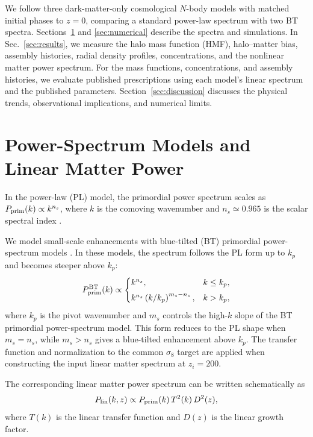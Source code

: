 \documentclass[
 reprint,
 superscriptaddress,
 nofootinbib,
 nobibnotes,
 amsmath,
 amssymb,
 aps,
 prd,
 floatfix,
 longbibliography
]{revtex4-2}
\DeclareRobustCommand{\change}[1]{#1}
\begin{document}
\change{We follow three dark-matter-only cosmological \(N\)-body models with matched initial phases to \(z=0\), comparing a standard power-law spectrum with two BT spectra. Sections~\ref{sec:theory} and \ref{sec:numerical} describe the spectra and simulations. In Sec.~\ref{sec:results}, we measure the halo mass function (HMF), halo--matter bias, assembly histories, radial density profiles, concentrations, and the nonlinear matter power spectrum. For the mass functions, concentrations, and assembly histories, we evaluate published prescriptions using each model's linear spectrum and the published parameters. Section~\ref{sec:discussion} discusses the physical trends, observational implications, and numerical limits.}

\section{Power-Spectrum Models and Linear Matter Power}
\label{sec:theory}
\label{subsec:power_models}

\change{In the power-law (PL) model, the primordial power spectrum scales as \(P_{\rm prim}(k)\propto k^{n_s}\), where \(k\) is the comoving wavenumber and \(n_s\simeq0.965\) is the scalar spectral index \citep{Planck20CMB}.}

We model small-scale enhancements with blue-tilted (BT) primordial power-spectrum models \citep[e.g.][]{Hira24bluetilt,Dekker25DwarfPPS}. In these models, the spectrum follows the PL form up to \(k_p\) and becomes steeper above \(k_p\):
\begin{equation}
P_{\rm prim}^{\rm BT}(k)
\propto
\begin{cases}
k^{n_s}, & k \le k_p,\\[4pt]
k^{n_s}\left(k/k_p\right)^{m_s-n_s}, & k > k_p,
\end{cases}
\label{eq:bt_input_power}
\end{equation}
where \(k_p\) is the pivot wavenumber and \(m_s\) controls the high-\(k\) slope of the BT primordial power-spectrum model. This form reduces to the PL shape when \(m_s=n_s\), while \(m_s>n_s\) gives a blue-tilted enhancement above \(k_p\). The transfer function and normalization to the common \(\sigma_8\) target are applied when constructing the input linear matter spectrum at \(z_i=200\).

The corresponding linear matter power spectrum can be written schematically as
\begin{equation}
P_{\rm lin}(k,z) \propto P_{\rm prim}(k)\,T^2(k)\,D^2(z),
\label{eq:P_MD}
\end{equation}
where \(T(k)\) is the linear transfer function and \(D(z)\) is the linear growth factor.
\end{document}
